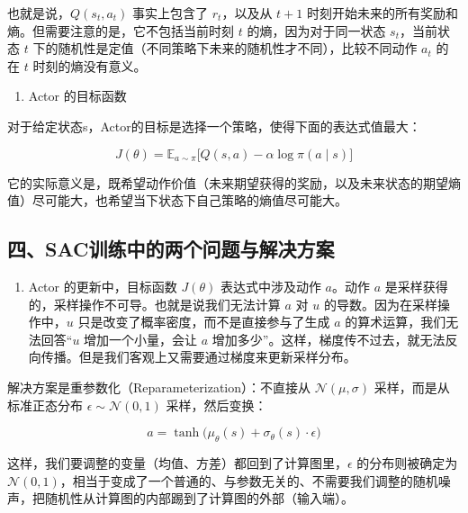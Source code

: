 也就是说，\(Q(s_t,a_t)\) 事实上包含了 \(r_t\)，以及从 \(t+1\) 时刻开始未来的所有奖励和熵。但需要注意的是，它不包括当前时刻 \(t\) 的熵，因为对于同一状态 \(s_t\)，当前状态 \(t\) 下的随机性是定值（不同策略下未来的随机性才不同），比较不同动作 \(a_t\) 的在 \(t\) 时刻的熵没有意义。

\begin{enumerate}
\def\labelenumi{\arabic{enumi}.}
\setcounter{enumi}{1}
\tightlist
\item
  Actor 的目标函数
\end{enumerate}

对于给定状态s，Actor的目标是选择一个策略，使得下面的表达式值最大：

\[
J(\theta)
=
\mathbb{E}_{a\sim\pi}
\bigl[
Q(s,a)
-
\alpha\log\pi(a\mid s)
\bigr]
\]

它的实际意义是，既希望动作价值（未来期望获得的奖励，以及未来状态的期望熵值）尽可能大，也希望当下状态下自己策略的熵值尽可能大。

\hypertarget{ux56dbsacux8badux7ec3ux4e2dux7684ux4e24ux4e2aux95eeux9898ux4e0eux89e3ux51b3ux65b9ux6848}{%
\subsection{四、SAC训练中的两个问题与解决方案}\label{ux56dbsacux8badux7ec3ux4e2dux7684ux4e24ux4e2aux95eeux9898ux4e0eux89e3ux51b3ux65b9ux6848}}

\begin{enumerate}
\def\labelenumi{\arabic{enumi}.}
\tightlist
\item
  Actor 的更新中，目标函数 \(J(\theta)\) 表达式中涉及动作 \(a\)。动作 \(a\) 是采样获得的，采样操作不可导。也就是说我们无法计算 \(a\) 对 \(u\) 的导数。因为在采样操作中，\(u\) 只是改变了概率密度，而不是直接参与了生成 \(a\) 的算术运算，我们无法回答``\(u\) 增加一个小量，会让 \(a\) 增加多少''。这样，梯度传不过去，就无法反向传播。但是我们客观上又需要通过梯度来更新采样分布。
\end{enumerate}

解决方案是重参数化（Reparameterization）：不直接从 \(\mathcal{N}(\mu,\sigma)\) 采样，而是从标准正态分布 \(\epsilon\sim\mathcal{N}(0,1)\) 采样，然后变换：

\[
a
=
\tanh\bigl(
\mu_\theta(s)+\sigma_\theta(s)\cdot\epsilon
\bigr)
\]

这样，我们要调整的变量（均值、方差）都回到了计算图里，\(\epsilon\) 的分布则被确定为 \(\mathcal{N}(0,1)\)，相当于变成了一个普通的、与参数无关的、不需要我们调整的随机噪声，把随机性从计算图的内部踢到了计算图的外部（输入端）。

